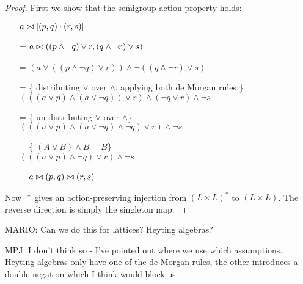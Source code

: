 \begin{proof}
  First we show that the semigroup action property holds:
  \begin{itemize}
    \item[ ]$a \bowtie \left[(p, q) \cdot (r, s)\right]$
    \item[=]$a \bowtie ((p \wedge \neg q) \vee r, (q \wedge \neg r) \vee s)$
    \item[=]$
      \left(
        a \vee
        \left(
          \left(
            p \wedge \neg q
          \right)
          \vee r
        \right)
      \right)
      \wedge \neg
      \left(
        \left(
          q \wedge \neg r
        \right)
        \vee s
      \right)$
    \item[=]\{ distributing $\vee$ over $\wedge$, applying both de Morgan rules \}\\
      $
      \left(
        \left(
          \left(  
            a \vee p
          \right)
          \wedge
          \left(
            a \vee \neg q
          \right)
        \right)
        \vee r
      \right)
      \wedge 
      \left(
        \neg q \vee r
      \right)
      \wedge
      \neg s
      $
    \item[=]\{ un-distributing $\vee$ over $\wedge $\}\\
      $
      \left(
        \left(
          \left(  
            a \vee p
          \right)
          \wedge
          \left(
            a \vee \neg q
          \right)
          \wedge
          \neg q
        \right)
        \vee r
      \right)
      \wedge
      \neg s
      $
    \item[=]\{ $(A \vee B) \wedge B = B$\}\\
      $
      \left(
        \left(
          \left(  
            a \vee p
          \right)
          \wedge
          \neg q
        \right)
        \vee r
      \right)
      \wedge
      \neg s
      $
    \item[=]$a \bowtie (p, q) \bowtie (r, s)$
  \end{itemize}

  Now $\cdot^\ast$ gives an action-preserving injection from $(L \times
  L)^\ast$ to $(L \times L)$. The reverse direction is simply the singleton map.
\end{proof}

MARIO: Can we do this for lattices? Heyting algebras?

MPJ: I don't think so - I've pointed out where we use which assumptions. Heyting
algebras only have one of the de Morgan rules, the other introduces a double negation which I
think would block us. 

